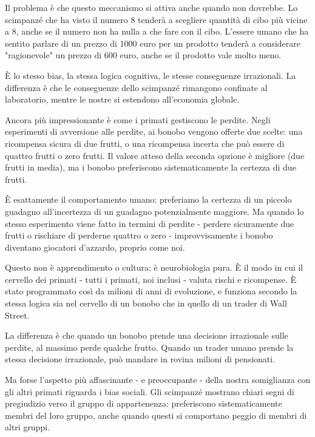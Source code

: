 Il problema è che questo meccanismo si attiva anche quando non dovrebbe. Lo scimpanzé che ha visto il numero 8 tenderà a scegliere quantità di cibo più vicine a 8, anche se il numero non ha nulla a che fare con il cibo. L'essere umano che ha sentito parlare di un prezzo di 1000 euro per un prodotto tenderà a considerare "ragionevole" un prezzo di 600 euro, anche se il prodotto vale molto meno.

È lo stesso bias, la stessa logica cognitiva, le stesse conseguenze irrazionali. La differenza è che le conseguenze dello scimpanzé rimangono confinate al laboratorio, mentre le nostre si estendono all'economia globale.

\medskip

Ancora più impressionante è come i primati gestiscono le perdite. Negli esperimenti di avversione alle perdite, ai bonobo vengono offerte due scelte: una ricompensa sicura di due frutti, o una ricompensa incerta che può essere di quattro frutti o zero frutti. Il valore atteso della seconda opzione è migliore (due frutti in media), ma i bonobo preferiscono sistematicamente la certezza di due frutti.

È esattamente il comportamento umano: preferiamo la certezza di un piccolo guadagno all'incertezza di un guadagno potenzialmente maggiore. Ma quando lo stesso esperimento viene fatto in termini di perdite - perdere sicuramente due frutti o rischiare di perderne quattro o zero - improvvisamente i bonobo diventano giocatori d'azzardo, proprio come noi.

Questo non è apprendimento o cultura: è neurobiologia pura. È il modo in cui il cervello dei primati - tutti i primati, noi inclusi - valuta rischi e ricompense. È stato programmato così da milioni di anni di evoluzione, e funziona secondo la stessa logica sia nel cervello di un bonobo che in quello di un trader di Wall Street.

La differenza è che quando un bonobo prende una decisione irrazionale sulle perdite, al massimo perde qualche frutto. Quando un trader umano prende la stessa decisione irrazionale, può mandare in rovina milioni di pensionati.

\bigskip

Ma forse l'aspetto più affascinante - e preoccupante - della nostra somiglianza con gli altri primati riguarda i bias sociali. Gli scimpanzé mostrano chiari segni di pregiudizio verso il gruppo di appartenenza: preferiscono sistematicamente membri del loro gruppo, anche quando questi si comportano peggio di membri di altri gruppi.

